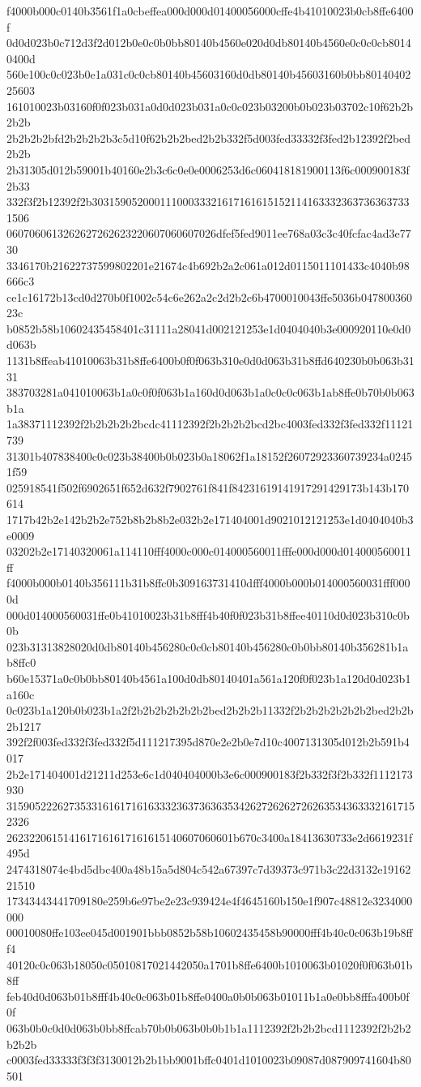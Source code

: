 f4000b000c0140b3561f1a0cbeffea000d000d01400056000cffe4b41010023b0cb8ffe6400f
0d0d023b0c712d3f2d012b0e0c0b0bb80140b4560e020d0db80140b4560e0c0c0cb80140400d
560e100c0c023b0e1a031c0c0cb80140b45603160d0db80140b45603160b0bb8014040225603
161010023b03160f0f023b031a0d0d023b031a0c0c023b03200b0b023b03702c10f62b2b2b2b
2b2b2b2bfd2b2b2b2b3c5d10f62b2b2bed2b2b332f5d003fed33332f3fed2b12392f2bed2b2b
2b31305d012b59001b40160e2b3c6c0e0e0006253d6c060418181900113f6c000900183f2b33
332f3f2b12392f2b303159052000111000333216171616151521141633323637363637331506
0607060613262627262623220607060607026dfef5fed9011ee768a03c3c40fcfac4ad3e7730
3346170b21622737599802201e21674c4b692b2a2c061a012d0115011101433c4040b98666c3
ce1c16172b13cd0d270b0f1002c54c6e262a2c2d2b2c6b4700010043ffe5036b04780036023c
b0852b58b10602435458401c31111a28041d002121253e1d0404040b3e000920110e0d0d063b
1131b8ffeab41010063b31b8ffe6400b0f0f063b310e0d0d063b31b8ffd640230b0b063b3131
383703281a041010063b1a0c0f0f063b1a160d0d063b1a0c0c0c063b1ab8ffe0b70b0b063b1a
1a38371112392f2b2b2b2b2bcdc41112392f2b2b2b2bcd2bc4003fed332f3fed332f11121739
31301b407838400c0c023b38400b0b023b0a18062f1a18152f26072923360739234a02451f59
025918541f502f6902651f652d632f7902761f841f84231619141917291429173b143b170614
1717b42b2e142b2b2e752b8b2b8b2e032b2e171404001d9021012121253e1d0404040b3e0009
03202b2e17140320061a114110fff4000c000c014000560011fffe000d000d014000560011ff
f4000b000b0140b356111b31b8ffc0b309163731410dfff4000b000b014000560031fff0000d
000d014000560031ffe0b41010023b31b8fff4b40f0f023b31b8ffee40110d0d023b310c0b0b
023b31313828020d0db80140b456280c0c0cb80140b456280c0b0bb80140b356281b1ab8ffc0
b60e15371a0c0b0bb80140b4561a100d0db80140401a561a120f0f023b1a120d0d023b1a160c
0c023b1a120b0b023b1a2f2b2b2b2b2b2b2bed2b2b2b11332f2b2b2b2b2b2b2bed2b2b2b1217
392f2f003fed332f3fed332f5d111217395d870e2e2b0e7d10c4007131305d012b2b591b4017
2b2e171404001d21211d253e6c1d040404000b3e6c000900183f2b332f3f2b332f1112173930
3159052226273533161617161633323637363635342627262627262635343633321617152326
2623220615141617161617161615140607060601b670c3400a18413630733e2d6619231f495d
2474318074e4bd5dbc400a48b15a5d804c542a67397c7d39373c971b3c22d3132e1916221510
17343443441709180e259b6e97be2e23c939424e4f4645160b150e1f907c48812e3234000000
00010080ffe103ee045d001901bbb0852b58b10602435458b90000fff4b40c0c063b19b8fff4
40120c0c063b18050c05010817021442050a1701b8ffe6400b1010063b01020f0f063b01b8ff
feb40d0d063b01b8fff4b40c0c063b01b8ffe0400a0b0b063b01011b1a0e0bb8fffa400b0f0f
063b0b0c0d0d063b0bb8ffcab70b0b063b0b0b1b1a1112392f2b2b2bcd1112392f2b2b2b2b2b
c0003fed33333f3f3f3130012b2b1bb9001bffc0401d1010023b09087d087909741604b80501
